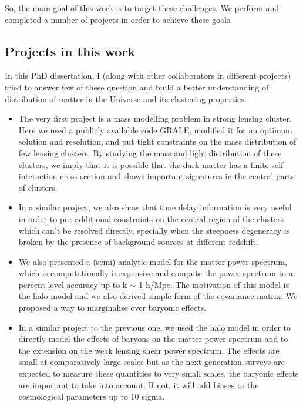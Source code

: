 So, the main goal of this work is to target these challenges. We perform and completed
a number of projects in order to achieve these goals. 


\subsection{Projects in this work}

In this PhD dissertation, I (along with other collaborators in different projects) tried
to answer few of these question and build a better understanding of distribution of 
matter in the Universe and its clustering properties. 

\begin{itemize}
\item	The very first project is a mass modelling problem in strong lensing cluster. Here we
	used a publicly available code GRALE, modified it for an optimum solution and resolution,
	and put tight constraints on the mass distribution of few lensing clusters. By studying
	the mass and light distribution of these clusters, we imply that it is possible 
	that the dark-matter has a finite self-interaction cross section and shows
	important signatures in the central parts of clusters. 

\item	In a similar project, we also show that time delay information is very useful in 
	order to put additional constraints on the central region of the clusters which can't 
	be resolved directly, specially when the steepness degeneracy is broken by the 
	presence of background sources at different redshift.

\item	We also presented a (semi) analytic model for the matter power spectrum, which is
	computationally inexpensive and compute the power spectrum to a percent level 
	accuracy up to k $\sim$ 1 h/Mpc. The motivation of this model is the halo model
	and we also derived simple form of the covariance matrix. We proposed a way to 
	marginalise over baryonic effects. 

\item	In a similar project to the previous one, we used the halo model in order to directly
	model the effects of baryons on the matter power spectrum and to the extension on the
	weak lensing shear power spectrum. The effects are small at comparatively large
	scales but as the next generation surveys are expected to measure these quantities 
	to very small scales, the baryonic effects are important to take into account. If not, 
	it will add biases to the cosmological parameters up to 10 sigma. 

\end{itemize}

